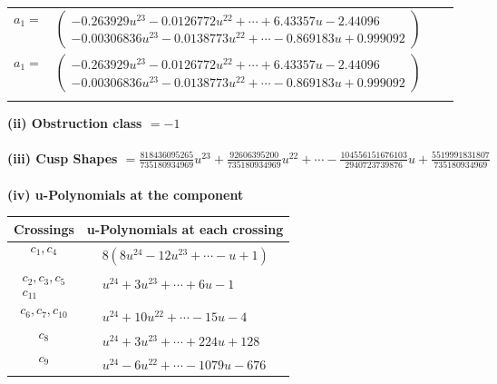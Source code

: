 \documentclass[1p]{elsarticle_modified}
\theoremstyle{definition}
\begin{document}
\begin{tabular}{m{7pt} m{180pt} m{7pt} m{180pt} }
\flushright $a_{1}=$&$\begin{pmatrix}-0.263929 u^{23}-0.0126772 u^{22}+\cdots+6.43357 u-2.44096\\-0.00306836 u^{23}-0.0138773 u^{22}+\cdots-0.869183 u+0.999092\end{pmatrix}$\\ \flushright $a_{1}=$&$\begin{pmatrix}-0.263929 u^{23}-0.0126772 u^{22}+\cdots+6.43357 u-2.44096\\-0.00306836 u^{23}-0.0138773 u^{22}+\cdots-0.869183 u+0.999092\end{pmatrix}$\\&\end{tabular}
\flushleft \textbf{(ii) Obstruction class $= -1$}\\~\\
\flushleft \textbf{(iii) Cusp Shapes $= \frac{818436095265}{735180934969} u^{23}+\frac{92606395200}{735180934969} u^{22}+\cdots-\frac{104556151676103}{2940723739876} u+\frac{5519991831807}{735180934969}$}\\~\\
\newpage\renewcommand{\arraystretch}{1}
\flushleft \textbf{(iv) u-Polynomials at the component}\newline \\
\begin{tabular}{m{50pt}|m{274pt}}
Crossings & \hspace{64pt}u-Polynomials at each crossing \\
\hline $$\begin{aligned}c_{1},c_{4}\end{aligned}$$&$\begin{aligned}
&8(8 u^{24}-12 u^{23}+\cdots- u+1)
\end{aligned}$\\
\hline $$\begin{aligned}c_{2},c_{3},c_{5}\\c_{11}\end{aligned}$$&$\begin{aligned}
&u^{24}+3 u^{23}+\cdots+6 u-1
\end{aligned}$\\
\hline $$\begin{aligned}c_{6},c_{7},c_{10}\end{aligned}$$&$\begin{aligned}
&u^{24}+10 u^{22}+\cdots-15 u-4
\end{aligned}$\\
\hline $$\begin{aligned}c_{8}\end{aligned}$$&$\begin{aligned}
&u^{24}+3 u^{23}+\cdots+224 u+128
\end{aligned}$\\
\hline $$\begin{aligned}c_{9}\end{aligned}$$&$\begin{aligned}
&u^{24}-6 u^{22}+\cdots-1079 u-676
\end{aligned}$\\
\hline
\end{tabular}\\~\\
\end{document}
